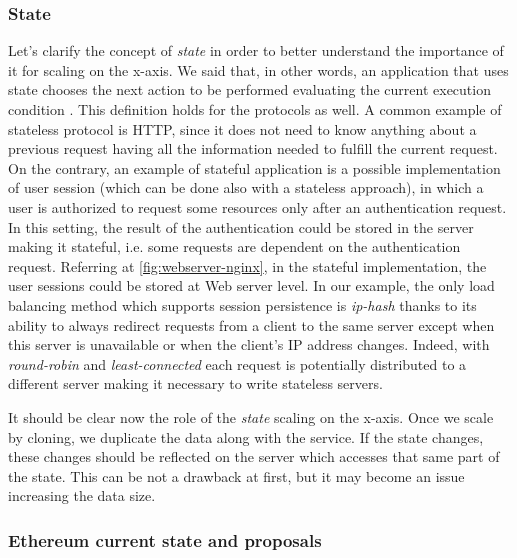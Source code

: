 \subsubsection{State}
Let's clarify the concept of \emph{state} in order to better understand the
importance of it for scaling on the x-axis. We said that, in other words, an
application that uses state chooses the next action to be performed evaluating
the current execution condition \cite{bib:art-of-scalability}. This definition
holds for the protocols as well. A common example of stateless protocol is HTTP,
since it does not need to know anything about a previous request having all the
information needed to fulfill the current request. On the contrary, an example
of stateful application is a possible implementation of user session (which can
be done also with a stateless approach), in which a user is authorized to
request some resources only after an authentication request. In this setting,
the result of the authentication could be stored in the server making it
stateful, i.e. some requests are dependent on the authentication request.
Referring at \autoref{fig:webserver-nginx}, in the stateful implementation, the
user sessions could be stored at Web server level. In our example, the only load
balancing method which supports session persistence is \emph{ip-hash} thanks to
its ability to always redirect requests from a client to the same server except
when this server is unavailable or when the client's IP address changes. Indeed,
with \emph{round-robin} and \emph{least-connected} each request is potentially
distributed to a different server making it necessary to write stateless
servers.

It should be clear now the role of the \emph{state} scaling on the x-axis. Once
we scale by cloning, we duplicate the data along with the service. If the state
changes, these changes should be reflected on the server which accesses that
same part of the state. This can be not a drawback at first, but it may become
an issue increasing the data size.

\subsubsection{Ethereum current state and proposals}
\label{sec:x-axis-ethereum}

